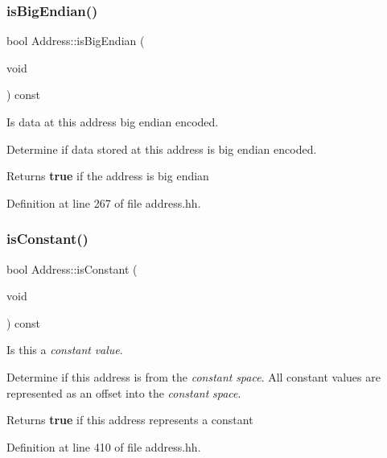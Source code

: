 \subsubsection{\texorpdfstring{isBigEndian()}{isBigEndian()}}
{\footnotesize\ttfamily bool Address\+::is\+Big\+Endian (\begin{DoxyParamCaption}\item[{void}]{ }\end{DoxyParamCaption}) const\hspace{0.3cm}{\ttfamily [inline]}}



Is data at this address big endian encoded. 

Determine if data stored at this address is big endian encoded. \begin{DoxyReturn}{Returns}
{\bfseries{true}} if the address is big endian 
\end{DoxyReturn}


Definition at line 267 of file address.\+hh.

\mbox{\label{class_address_a8ef20a60dfb144bb91c466432e377eb5}} 
\subsubsection{\texorpdfstring{isConstant()}{isConstant()}}
{\footnotesize\ttfamily bool Address\+::is\+Constant (\begin{DoxyParamCaption}\item[{void}]{ }\end{DoxyParamCaption}) const\hspace{0.3cm}{\ttfamily [inline]}}



Is this a {\itshape constant} {\itshape value}. 

Determine if this address is from the {\itshape constant} {\itshape space}. All constant values are represented as an offset into the {\itshape constant} {\itshape space}. \begin{DoxyReturn}{Returns}
{\bfseries{true}} if this address represents a constant 
\end{DoxyReturn}


Definition at line 410 of file address.\+hh.

\mbox{\label{class_address_a77b6efa62ad4f31c95f3861b79d3ed5e}} 
